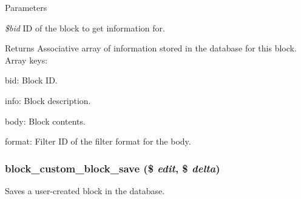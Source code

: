 \begin{DoxyParams}{Parameters}
\item[{\em \$bid}]ID of the block to get information for.\end{DoxyParams}
\begin{DoxyReturn}{Returns}
Associative array of information stored in the database for this block. Array keys:
\begin{DoxyItemize}
\item bid: Block ID.
\item info: Block description.
\item body: Block contents.
\item format: Filter ID of the filter format for the body. 
\end{DoxyItemize}
\end{DoxyReturn}
\hypertarget{block_8module_ad1db1c6a44b79bb7d62dc07d6cfd60b8}{
\subsubsection[{block\_\-custom\_\-block\_\-save}]{\setlength{\rightskip}{0pt plus 5cm}block\_\-custom\_\-block\_\-save (\$ {\em edit}, \/  \$ {\em delta})}}
\label{block_8module_ad1db1c6a44b79bb7d62dc07d6cfd60b8}
Saves a user-\/created block in the database.



